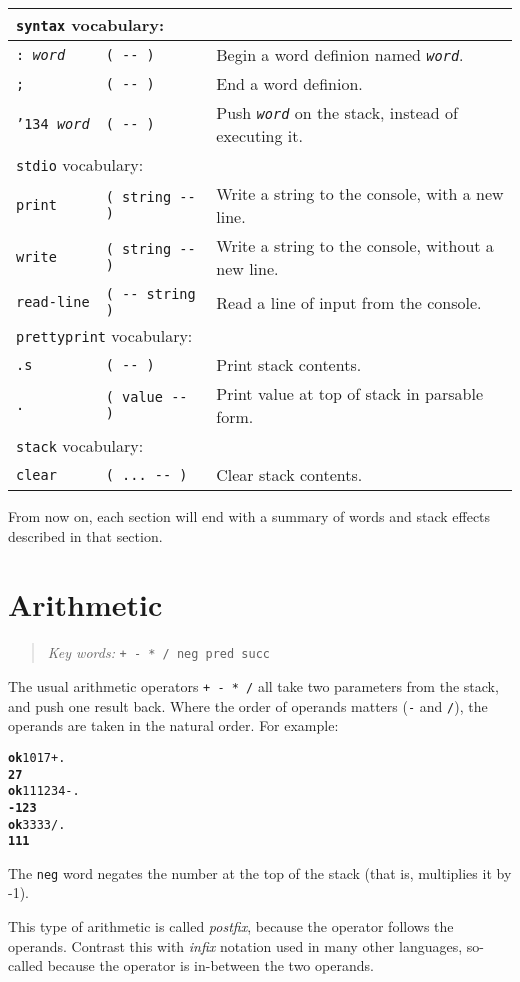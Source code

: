 \documentclass[english]{book}
\newcommand{\ttbackslash}{\char'134}
\newcommand{\chapkeywords}[1]{%
\begin{quote}
\emph{Key words:} \texttt{#1}
\end{quote}
}
\newcommand{\wordtable}[1]{{
\begin{tabularx}{12cm}{|l l X|}
#1
\hline
\end{tabularx}}}
\newcommand{\tabvocab}[1]{
\hline
\multicolumn{3}{|l|}{
\rule[-2mm]{0mm}{6mm}
\texttt{#1} vocabulary:}
\\
\hline
}
\begin{document}
\wordtable{
\tabvocab{syntax}
\texttt{:~\emph{word}}&
\texttt{( -{}- )}&
Begin a word definion named \texttt{\emph{word}}.\\
\texttt{;}&
\texttt{( -{}- )}&
End a word definion.\\
\texttt{\ttbackslash\ \emph{word}}&
\texttt{( -{}- )}&
Push \texttt{\emph{word}} on the stack, instead of executing it.\\
\tabvocab{stdio}
\texttt{print}&
\texttt{( string -{}- )}&
Write a string to the console, with a new line.\\
\texttt{write}&
\texttt{( string -{}- )}&
Write a string to the console, without a new line.\\
\texttt{read-line}&
\texttt{( -{}- string )}&
Read a line of input from the console.\\
\tabvocab{prettyprint}
\texttt{.s}&
\texttt{( -{}- )}&
Print stack contents.\\
\texttt{.}&
\texttt{( value -{}- )}&
Print value at top of stack in parsable form.\\
\tabvocab{stack}
\texttt{clear}&
\texttt{( ...~-{}- )}&
Clear stack contents.\\
}

From now on, each section will end with a summary of words and stack effects described in that section.

\section{Arithmetic}

\chapkeywords{+ - {*} / neg pred succ}
\index{\texttt{+}}
\index{\texttt{-}}
\index{\texttt{*}}
\index{\texttt{/}}

The usual arithmetic operators \texttt{+ - {*} /} all take two parameters
from the stack, and push one result back. Where the order of operands
matters (\texttt{-} and \texttt{/}), the operands are taken in the natural order. For example:

\begin{alltt}
\textbf{ok} 10 17 + .
\textbf{27}
\textbf{ok} 111 234 - .
\textbf{-123}
\textbf{ok} 333 3 / .
\textbf{111}
\end{alltt}

The \texttt{neg} word negates the number at the top of the stack (that is, multiplies it by -1). 

This type of arithmetic is called \emph{postfix}, because the operator
follows the operands. Contrast this with \emph{infix} notation used
in many other languages, so-called because the operator is in-between
the two operands.
\end{document}
